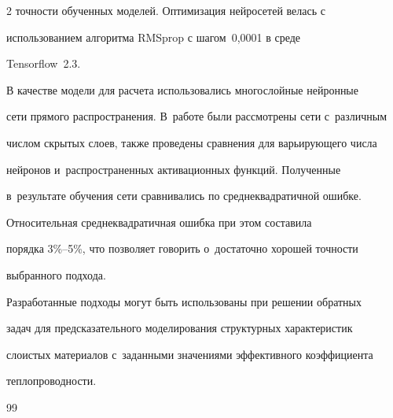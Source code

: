 \begin{multicols}{2}
точности обученных моделей. Оптимизация нейросетей велась с 


использованием алгоритма \mbox{RMSprop} с шагом~0,0001 в среде 


\mbox{Tensorflow}~2.3.


{





}


    


    В качестве модели для расчета использовались многослойные нейронные 


сети прямого распространения. В~работе были рассмотрены сети с~различным 


числом скрытых слоев, также проведены сравнения для варьирующего числа 


нейронов и~распространенных активационных функций. Полученные 


в~результате обучения сети сравнивались по среднеквадратичной ошибке. 




    Относительная среднеквадратичная ошибка при этом составила  


порядка 3\%--5\%, что позволяет говорить о~достаточно хорошей точности 


выбранного подхода.


{ %





}


    


    Разработанные подходы могут быть использованы при решении обратных 


задач для предсказательного моделирования структурных характеристик 


слоистых материалов с~заданными значениями эффективного коэффициента 


теплопроводности.


    


{\small\frenchspacing


 {%




 \begin{thebibliography}{99}


     



\end{thebibliography}}}
\end{multicols}

